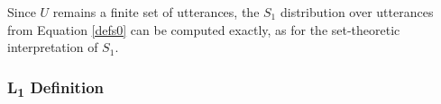 \documentclass[OpenMind]{stjour}
\begin{document}
		Since $U$ remains a finite set of utterances, the $S_1$ distribution over utterances from Equation \ref{defs0} can be computed exactly, as for the set-theoretic interpretation of $S_1$. 







\subsubsection{L\textsubscript{1} Definition}
\end{document}
